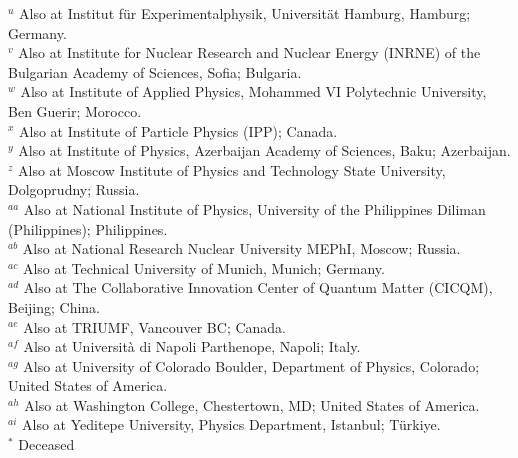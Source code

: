 \begin{flushleft}
$^{u}$ Also at Institut f\"{u}r Experimentalphysik, Universit\"{a}t Hamburg, Hamburg; Germany.\\
$^{v}$ Also at Institute for Nuclear Research and Nuclear Energy (INRNE) of the Bulgarian Academy of Sciences, Sofia; Bulgaria.\\
$^{w}$ Also at Institute of Applied Physics, Mohammed VI Polytechnic University, Ben Guerir; Morocco.\\
$^{x}$ Also at Institute of Particle Physics (IPP); Canada.\\
$^{y}$ Also at Institute of Physics, Azerbaijan Academy of Sciences, Baku; Azerbaijan.\\
$^{z}$ Also at Moscow Institute of Physics and Technology State University, Dolgoprudny; Russia.\\
$^{aa}$ Also at National Institute of Physics, University of the Philippines Diliman (Philippines); Philippines.\\
$^{ab}$ Also at National Research Nuclear University MEPhI, Moscow; Russia.\\
$^{ac}$ Also at Technical University of Munich, Munich; Germany.\\
$^{ad}$ Also at The Collaborative Innovation Center of Quantum Matter (CICQM), Beijing; China.\\
$^{ae}$ Also at TRIUMF, Vancouver BC; Canada.\\
$^{af}$ Also at Universit\`a  di Napoli Parthenope, Napoli; Italy.\\
$^{ag}$ Also at University of Colorado Boulder, Department of Physics, Colorado; United States of America.\\
$^{ah}$ Also at Washington College, Chestertown, MD; United States of America.\\
$^{ai}$ Also at Yeditepe University, Physics Department, Istanbul; Türkiye.\\
$^{*}$ Deceased

\end{flushleft}

